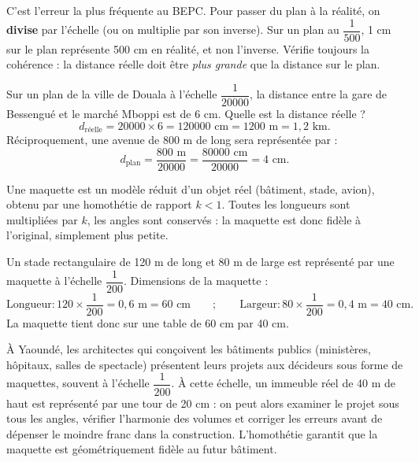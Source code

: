 \documentclass[11pt]{article}
\newcounter{popsec}
\newcounter{popsub}
\newcommand{\courssub}[1]{%
  \stepcounter{popsub}%
  \par\vspace{9pt}\noindent{\popxbold\fontsize{11.5}{13}\selectfont\color{popink}{\color{poporange}\thepopsec.\thepopsub}\hspace{6pt}#1}\par\nopagebreak\vspace{4pt}
}
\begin{document}
\begin{attention}
C'est l'erreur la plus fréquente au BEPC. Pour passer du plan à la réalité, on \textbf{divise} par l'échelle (ou on multiplie par son inverse). Sur un plan au $\dfrac{1}{500}$, 1 cm sur le plan représente 500 cm en réalité, et non l'inverse. Vérifie toujours la cohérence : la distance réelle doit être \emph{plus grande} que la distance sur le plan.
\end{attention}

\begin{exemplebox}
Sur un plan de la ville de Douala à l'échelle $\dfrac{1}{\num{20000}}$, la distance entre la gare de Bessengué et le marché Mboppi est de 6 cm. Quelle est la distance réelle ?
\[ d_{\text{réelle}} = \num{20000} \times 6 = \num{120000} \text{ cm} = \num{1200} \text{ m} = 1,2 \text{ km}. \]
Réciproquement, une avenue de 800 m de long sera représentée par :
\[ d_{\text{plan}} = \dfrac{800 \text{ m}}{\num{20000}} = \dfrac{\num{80000} \text{ cm}}{\num{20000}} = 4 \text{ cm}. \]
\end{exemplebox}

\courssub{Maquettes et modèles réduits}

Une maquette est un modèle réduit d'un objet réel (bâtiment, stade, avion), obtenu par une homothétie de rapport $k<1$. Toutes les longueurs sont multipliées par $k$, les angles sont conservés : la maquette est donc fidèle à l'original, simplement plus petite.

\begin{exemplebox}
Un stade rectangulaire de 120 m de long et 80 m de large est représenté par une maquette à l'échelle $\dfrac{1}{200}$. Dimensions de la maquette :
\[ \text{Longueur} : 120 \times \dfrac{1}{200} = 0,6 \text{ m} = 60 \text{ cm} \qquad ; \qquad \text{Largeur} : 80 \times \dfrac{1}{200} = 0,4 \text{ m} = 40 \text{ cm}. \]
La maquette tient donc sur une table de 60 cm par 40 cm.
\end{exemplebox}

\begin{savaistu}
À Yaoundé, les architectes qui conçoivent les bâtiments publics (ministères, hôpitaux, salles de spectacle) présentent leurs projets aux décideurs sous forme de maquettes, souvent à l'échelle $\dfrac{1}{200}$. À cette échelle, un immeuble réel de 40 m de haut est représenté par une tour de 20 cm : on peut alors examiner le projet sous tous les angles, vérifier l'harmonie des volumes et corriger les erreurs avant de dépenser le moindre franc dans la construction. L'homothétie garantit que la maquette est géométriquement fidèle au futur bâtiment.
\end{savaistu}
\end{document}
